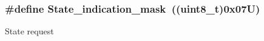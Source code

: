 \subsubsection[{\texorpdfstring{State\+\_\+indication\+\_\+mask}{State_indication_mask}}]{\setlength{\rightskip}{0pt plus 5cm}\#define State\+\_\+indication\+\_\+mask~((uint8\+\_\+t)0x07\+U)}\hypertarget{group___u_a_r_t___control___from_gac1dc46273764bf13be2f30fcc60806a4}{}\label{group___u_a_r_t___control___from_gac1dc46273764bf13be2f30fcc60806a4}
State request 